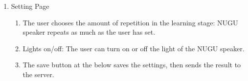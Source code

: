 \documentclass[conference]{IEEEtran}
\begin{document}
\begin{enumerate}
\begin{enumerate}
\begin{enumerate}
                \end{enumerate}
            \end{enumerate}
        \item Setting Page
            \begin{enumerate}
                \item The user chooses the amount of repetition in the learning stage: NUGU speaker repeats as much as the user has set.
                \item Lights on/off: The user can turn on or off the light of the NUGU speaker.
                \item The save button at the below saves the settings, then sends the result to the server.
            \end{enumerate}
    \end{enumerate}
\end{document}
